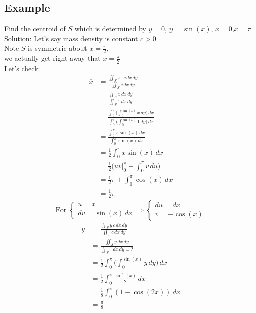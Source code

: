 \documentclass[12pt]{article}
\begin{document}
  \subsection*{Example}
    Find the centroid of $S$ which is determined by $y=0$, $y=\sin(x)$, $x=0$,$x=\pi$ \\
    \underline{Solution}: Let's say mass density is constant $c>0$ \\
    Note $S$ is symmetric about $x=\frac{\pi}{2}$, \\
    we actually get right away that $\overline{x}=\frac{\pi}{2}$ \\
    Let's check: \\
    \begin{align*}
      \overline{x} & =\frac{\iint_Sx\cdot c\,dx\,dy}{\iint_Sc\,dx\,dy} \\
      & = \frac{\iint_Sx\,dx\,dy}{\iint_S1\,dx\,dy} \\
      & = \frac{\int_0^{\pi}\bigg(\int_0^{\sin(x)}x\,dy\bigg)\,dx}{\int_0^{\pi}\bigg(\int_0^{\sin(x)}1\,dy\bigg)\,dx} \\
      & = \frac{\int_0^{\pi}x\sin(x)\,dx}{\int_0^{\pi}\sin(x)\,dx} \\
      & = \frac{1}{2}\int_0^{\pi}x\sin(x)\,dx \\
      & = \frac{1}{2}\bigg(uv\biggr\rvert_0^{\pi}-\int_0^{\pi}v\,du\bigg) \\
      & = \frac{1}{2}\pi+\int_0^{\pi}\cos(x)\,dx \\
      & = \frac{1}{2}\pi
    \end{align*}
    \[ \text{For }
      \begin{cases}
        u=x \\
        dv=\sin(x)\,dx
      \end{cases}
      \Rightarrow
      \begin{cases}
        du=dx \\
        v=-\cos(x)
      \end{cases}
    \]
    \begin{align*}
      \overline{y} & = \frac{\iint_Sy\,c\,dx\,dy}{\iint_Sc\,dx\,dy} \\
      & = \frac{\iint_Sy\,dx\,dy}{\iint_S1\,dx\,dy = 2} \\
      & = \frac{1}{2}\int_0^{\pi}\bigg(\int_0^{\sin(x)}y\,dy\bigg)\,dx \\
      & = \frac{1}{2}\int_0^{\pi}\frac{\sin^2(x)}{2}\,dx \\
      & = \frac{1}{8}\int_0^{\pi}(1-\cos(2x))\,dx \\
      & = \frac{\pi}{8}
    \end{align*}
\end{document}
